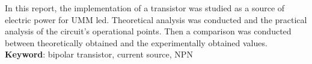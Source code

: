  \setlength{\absparsep}{18pt} %
\begin{resumo}[Abstract]
In this report, the implementation of a transistor was studied as a source of electric power for UMM led. Theoretical analysis was conducted and the practical analysis of the circuit's operational points. Then a comparison was conducted between theoretically obtained and the experimentally obtained values. \\
 \noindent
 \textbf{Keyword}: bipolar transistor, current source, NPN
 \end{resumo} 